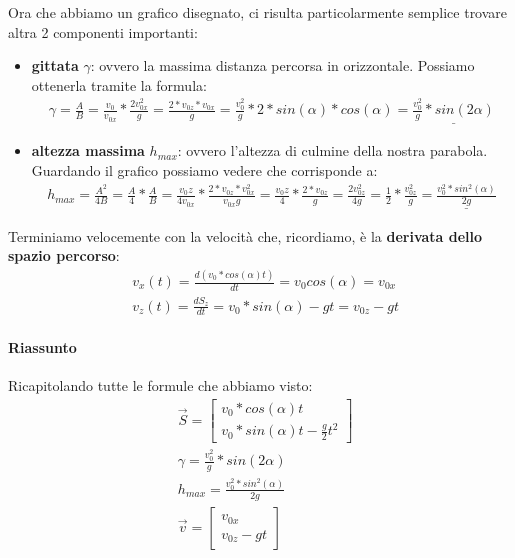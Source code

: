 				Ora che abbiamo un grafico disegnato, ci risulta particolarmente semplice trovare altra 2 componenti importanti:
				\begin{itemize}
					\item \textbf{gittata} $\gamma$: ovvero la massima distanza percorsa in orizzontale. Possiamo ottenerla tramite la formula:
					\begin{align*}
						\gamma = \frac{A}{B} = \frac{v_0}{v_{0x}}*\frac{2v_{0x}^2}{g} = \frac{2*v_{0z}*v_{0x}}{g}= \frac{v_0^2}{g}*2*sin(\alpha)*cos(\alpha) = \underline{\frac{v_0^2}{g}*sin(2\alpha)}
					\end{align*}
					\item \textbf{altezza massima} $h_{max}$: ovvero l'altezza di culmine della nostra parabola. Guardando il grafico possiamo vedere che corrisponde a:
					\begin{align*}
						h_{max} = \frac{A^2}{4B} = \frac{A}{4}*\frac{A}{B} = \frac{v_0z}{4v_{0x}}*\frac{2*v_{0z}*v_{0x}^2}{v_{0x}g} = \frac{v_0z}{4}*\frac{2*v_{0z}}{g} = \frac{2v_{0z}^2}{4g} = \frac{1}{2}*\frac{v_{0z}^2}{g} = \underline{\frac{v_0^2 * sin^2(\alpha)}{2g}}
					\end{align*}
				\end{itemize}
				Terminiamo velocemente con la velocità che, ricordiamo, è la \textbf{derivata dello spazio percorso}:
				\begin{align*}
					&v_x(t) = \frac{d(v_0*cos(\alpha)t)}{dt} = v_0 cos(\alpha) = v_{0x}\\
					&v_z(t) = \frac{d S_z}{dt} = v_0*sin(\alpha)-gt = v_{0z}-gt
				\end{align*}

				\paragraph{Riassunto}
					Ricapitolando tutte le formule che abbiamo visto:
					\begin{align*}
						&\vec{S}=
						\begin{bmatrix}
							v_0*cos(\alpha)t\\
							v_0*sin(\alpha)t-\frac{g}{2}t^2
						\end{bmatrix}\\
						&\gamma = \frac{v_0^2}{g}*sin(2\alpha)\\
						&h_{max} = \frac{v_0^2 * sin^2(\alpha)}{2g}\\
						&\vec{v}=
						\begin{bmatrix}
							v_{0x}\\
							v_{0z}-gt
						\end{bmatrix}\\
					\end{align*}

